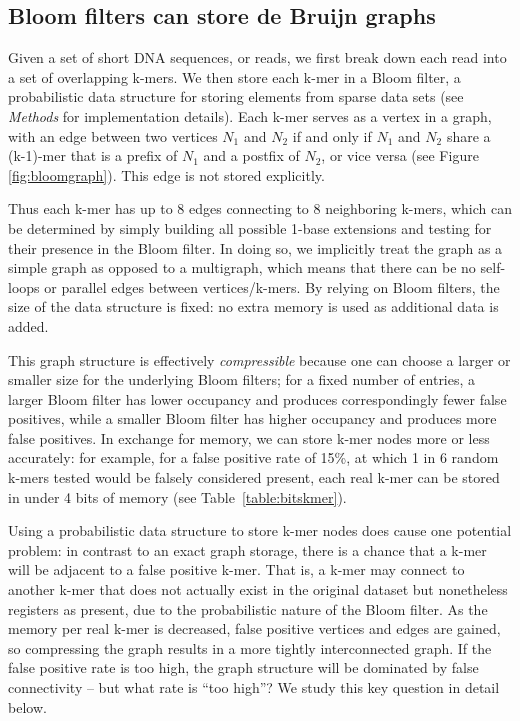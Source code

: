 \documentclass{pnastwo}
\begin{document}
\begin{article}
\subsection{Bloom filters can store de Bruijn graphs}

Given a set of short DNA sequences, or reads, we first break down each
read into a set of overlapping k-mers.  We then store each k-mer in a
Bloom filter, a probabilistic data structure for storing elements from
sparse data sets (see \emph{Methods} for implementation details).
Each k-mer serves as a vertex in a graph, with an edge between two
vertices $N_1$ and $N_2$ if and only if $N_1$ and $N_2$ share a
(k-1)-mer that is a prefix of $N_1$ and a postfix of $N_2$, or vice
versa (see Figure \ref{fig:bloomgraph}).  This edge is not stored
explicitly.

Thus each k-mer has up to 8 edges connecting to 8 neighboring k-mers,
which can be determined by simply building all possible 1-base
extensions and testing for their presence in the Bloom filter.  In
doing so, we implicitly treat the graph as a simple graph as opposed
to a multigraph, which means that there can be no self-loops or
parallel edges between vertices/k-mers.  By relying on Bloom filters,
the size of the data structure is fixed: no extra memory is used as
additional data is added.

This graph structure is effectively {\em compressible} because one can
choose a larger or smaller size for the underlying Bloom filters; for
a fixed number of entries, a larger Bloom filter has lower occupancy
and produces correspondingly fewer false positives, while a smaller
Bloom filter has higher occupancy and produces more false
positives. In exchange for memory, we can store k-mer nodes more or
less accurately: for example, for a false positive rate of 15\%, at
which 1 in 6 random k-mers tested would be falsely considered present,
each real k-mer can be stored in under 4 bits of memory (see
Table~\ref{table:bitskmer}).

Using a probabilistic data structure to store k-mer nodes does cause
one potential problem: in contrast to an exact graph storage, there is
a chance that a k-mer will be adjacent to a false positive k-mer.
That is, a k-mer may connect to another k-mer that does not actually
exist in the original dataset but nonetheless registers as present,
due to the probabilistic nature of the Bloom filter.  As the memory
per real k-mer is decreased, false positive vertices and edges are
gained, so compressing the graph results in a more tightly
interconnected graph.  If the false positive rate is too high, the
graph structure will be dominated by false connectivity -- but what
rate is ``too high''?  We study this key question in detail below.


\end{article}
\end{document}
